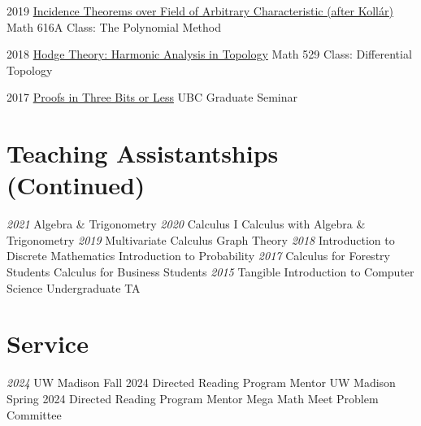 \documentclass[a4paper]{cv-friggeri}
\begin{document}
\begin{entrylist}
\entry
{2019}
{\href{https://github.com/jdjake/Notes/raw/master/Talks/TalkNotes/SzemerediTrotterin3D.pdf}{Incidence Theorems over Field of Arbitrary Characteristic (after Koll\'{a}r)}}
{}
{Math 616A Class: The Polynomial Method}

\entry
{2018}
{\href{https://github.com/jdjake/Notes/raw/master/Talks/TalkNotes/HodgeTheory.pdf}{Hodge Theory: Harmonic Analysis in Topology}}
{}
{Math 529 Class: Differential Topology}



\entry
{2017}
{\href{https://github.com/jdjake/Notes/raw/master/Talks/TalkNotes/ProofsInThreeBits.pdf}{Proofs in Three Bits or Less}}
{}
{UBC Graduate Seminar}



\end{entrylist}

\begin{asidenotit}
\section{Teaching Assistantships (Continued)}
\emph{2021}
Algebra \& Trigonometry
\emph{2020}
Calculus I
Calculus with Algebra \& Trigonometry
\emph{2019}
Multivariate Calculus
Graph Theory
\emph{2018}
Introduction to Discrete Mathematics
Introduction to Probability
\emph{2017}
Calculus for Forestry Students
Calculus for Business Students
\emph{2015}
Tangible Introduction to Computer Science Undergraduate TA
~
\section{Service}
\emph{2024}
UW Madison Fall 2024 Directed Reading Program Mentor
UW Madison Spring 2024 Directed Reading Program Mentor
Mega Math Meet Problem Committee
\end{asidenotit}
\end{document}
